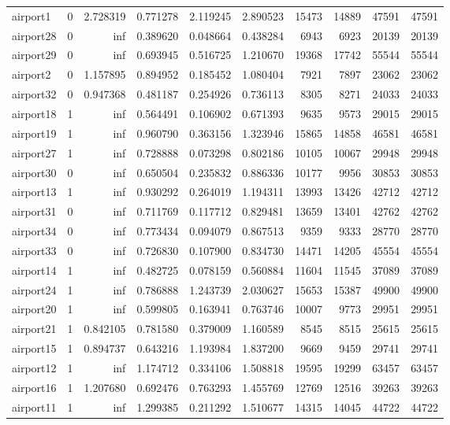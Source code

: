 \begin{longtable}{|l|r|r|r|r|r|r|r|r|r|}
airport1 & 0 & 2.728319 & 0.771278 & 2.119245 & 2.890523 & 15473 & 14889 & 47591 & 47591 \\
airport28 & 0 & inf & 0.389620 & 0.048664 & 0.438284 & 6943 & 6923 & 20139 & 20139 \\
airport29 & 0 & inf & 0.693945 & 0.516725 & 1.210670 & 19368 & 17742 & 55544 & 55544 \\
airport2 & 0 & 1.157895 & 0.894952 & 0.185452 & 1.080404 & 7921 & 7897 & 23062 & 23062 \\
airport32 & 0 & 0.947368 & 0.481187 & 0.254926 & 0.736113 & 8305 & 8271 & 24033 & 24033 \\
airport18 & 1 & inf & 0.564491 & 0.106902 & 0.671393 & 9635 & 9573 & 29015 & 29015 \\
airport19 & 1 & inf & 0.960790 & 0.363156 & 1.323946 & 15865 & 14858 & 46581 & 46581 \\
airport27 & 1 & inf & 0.728888 & 0.073298 & 0.802186 & 10105 & 10067 & 29948 & 29948 \\
airport30 & 0 & inf & 0.650504 & 0.235832 & 0.886336 & 10177 & 9956 & 30853 & 30853 \\
airport13 & 1 & inf & 0.930292 & 0.264019 & 1.194311 & 13993 & 13426 & 42712 & 42712 \\
airport31 & 0 & inf & 0.711769 & 0.117712 & 0.829481 & 13659 & 13401 & 42762 & 42762 \\
airport34 & 0 & inf & 0.773434 & 0.094079 & 0.867513 & 9359 & 9333 & 28770 & 28770 \\
airport33 & 0 & inf & 0.726830 & 0.107900 & 0.834730 & 14471 & 14205 & 45554 & 45554 \\
airport14 & 1 & inf & 0.482725 & 0.078159 & 0.560884 & 11604 & 11545 & 37089 & 37089 \\
airport24 & 1 & inf & 0.786888 & 1.243739 & 2.030627 & 15653 & 15387 & 49900 & 49900 \\
airport20 & 1 & inf & 0.599805 & 0.163941 & 0.763746 & 10007 & 9773 & 29951 & 29951 \\
airport21 & 1 & 0.842105 & 0.781580 & 0.379009 & 1.160589 & 8545 & 8515 & 25615 & 25615 \\
airport15 & 1 & 0.894737 & 0.643216 & 1.193984 & 1.837200 & 9669 & 9459 & 29741 & 29741 \\
airport12 & 1 & inf & 1.174712 & 0.334106 & 1.508818 & 19595 & 19299 & 63457 & 63457 \\
airport16 & 1 & 1.207680 & 0.692476 & 0.763293 & 1.455769 & 12769 & 12516 & 39263 & 39263 \\
airport11 & 1 & inf & 1.299385 & 0.211292 & 1.510677 & 14315 & 14045 & 44722 & 44722 \\

\end{longtable}
